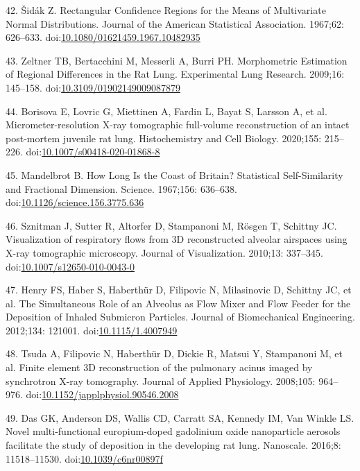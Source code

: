 \documentclass[
  american,
]{article}
\newenvironment{cslreferences}%
  {}%
  {\par}
\begin{document}
\begin{cslreferences}
\leavevmode\hypertarget{ref-GtCynqsI}{}%
42. Šidák Z. Rectangular Confidence Regions for the Means of Multivariate Normal Distributions. Journal of the American Statistical Association. 1967;62: 626--633. doi:\href{https://doi.org/10.1080/01621459.1967.10482935}{10.1080/01621459.1967.10482935}

\leavevmode\hypertarget{ref-I9TmP6IU}{}%
43. Zeltner TB, Bertacchini M, Messerli A, Burri PH. Morphometric Estimation of Regional Differences in the Rat Lung. Experimental Lung Research. 2009;16: 145--158. doi:\href{https://doi.org/10.3109/01902149009087879}{10.3109/01902149009087879}

\leavevmode\hypertarget{ref-Zv1XcgAO}{}%
44. Borisova E, Lovric G, Miettinen A, Fardin L, Bayat S, Larsson A, et al. Micrometer-resolution X-ray tomographic full-volume reconstruction of an intact post-mortem juvenile rat lung. Histochemistry and Cell Biology. 2020;155: 215--226. doi:\href{https://doi.org/10.1007/s00418-020-01868-8}{10.1007/s00418-020-01868-8}

\leavevmode\hypertarget{ref-AdXhaEV4}{}%
45. Mandelbrot B. How Long Is the Coast of Britain? Statistical Self-Similarity and Fractional Dimension. Science. 1967;156: 636--638. doi:\href{https://doi.org/10.1126/science.156.3775.636}{10.1126/science.156.3775.636}

\leavevmode\hypertarget{ref-eioib1TQ}{}%
46. Sznitman J, Sutter R, Altorfer D, Stampanoni M, Rösgen T, Schittny JC. Visualization of respiratory flows from 3D reconstructed alveolar airspaces using X-ray tomographic microscopy. Journal of Visualization. 2010;13: 337--345. doi:\href{https://doi.org/10.1007/s12650-010-0043-0}{10.1007/s12650-010-0043-0}

\leavevmode\hypertarget{ref-1HOyVjqpM}{}%
47. Henry FS, Haber S, Haberthür D, Filipovic N, Milasinovic D, Schittny JC, et al. The Simultaneous Role of an Alveolus as Flow Mixer and Flow Feeder for the Deposition of Inhaled Submicron Particles. Journal of Biomechanical Engineering. 2012;134: 121001. doi:\href{https://doi.org/10.1115/1.4007949}{10.1115/1.4007949}

\leavevmode\hypertarget{ref-OT4s1CSX}{}%
48. Tsuda A, Filipovic N, Haberthür D, Dickie R, Matsui Y, Stampanoni M, et al. Finite element 3D reconstruction of the pulmonary acinus imaged by synchrotron X-ray tomography. Journal of Applied Physiology. 2008;105: 964--976. doi:\href{https://doi.org/10.1152/japplphysiol.90546.2008}{10.1152/japplphysiol.90546.2008}

\leavevmode\hypertarget{ref-VJYqPtdT}{}%
49. Das GK, Anderson DS, Wallis CD, Carratt SA, Kennedy IM, Van Winkle LS. Novel multi-functional europium-doped gadolinium oxide nanoparticle aerosols facilitate the study of deposition in the developing rat lung. Nanoscale. 2016;8: 11518--11530. doi:\href{https://doi.org/10.1039/c6nr00897f}{10.1039/c6nr00897f}


\end{cslreferences}
\end{document}
